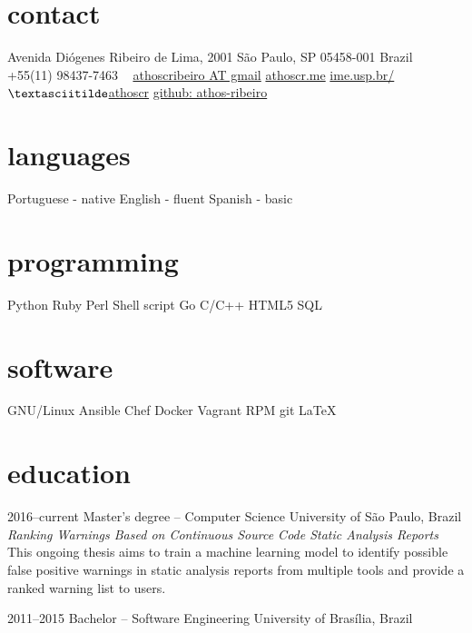 \documentclass[]{friggeri-cv} %
\begin{document}


\begin{aside} %
\section{contact}
Avenida Diógenes Ribeiro de Lima, 2001
São Paulo, SP 05458-001
Brazil
~
+55(11) 98437-7463
~
\href{mailto:athoscribeiro@gmail.com}{athoscribeiro AT gmail}
\href{http://athoscr.me}{athoscr.me}
\href{https://www.ime.usp.br/~athoscr}{ime.usp.br/$\textasciitilde$athoscr}
\href{https://github.com/athos-ribeiro}{github: athos-ribeiro}
\section{languages}
Portuguese - native
English - fluent
Spanish - basic
\section{programming}
Python
Ruby
Perl
Shell script
Go
C/C++
HTML5
SQL
\section{software}
GNU/Linux
Ansible
Chef
Docker
Vagrant
RPM
git
\LaTeX
\end{aside}


\section{education}

\begin{entrylist}


\entry
{2016--current}
{Master's degree -- {\normalfont Computer Science}}
{University of São Paulo, Brazil}
  {\emph{Ranking Warnings Based on Continuous Source Code Static Analysis Reports} \\ This ongoing thesis aims to train a machine learning model to identify possible false positive warnings in static analysis reports from multiple tools and provide a ranked warning list to users.}


\entry
{2011--2015}
{Bachelor -- {\normalfont Software Engineering}}
{University of Brasília, Brazil}


\end{entrylist}
\end{document}
